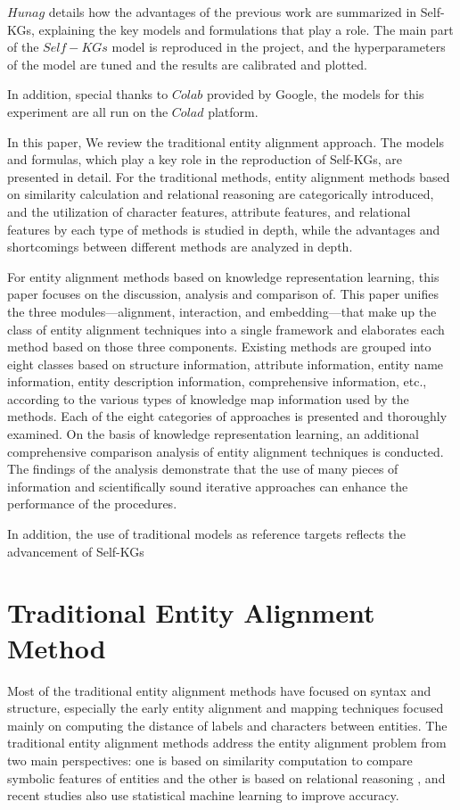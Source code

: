 \documentclass[sigconf]{acmart}
\begin{document}
$Hunag$ details how the advantages of the previous work are summarized in Self-KGs, explaining the key models and formulations that play a role. The main part of the $Self-KGs$ model is reproduced in the project, and the hyperparameters of the model are tuned and the results are calibrated and plotted.

In addition, special thanks to $Colab$ provided by Google, the models for this experiment are all run on the $Colad$ platform.

In this paper, We review the traditional entity alignment approach. The models and formulas, which play a key role in the reproduction of Self-KGs, are presented in detail. For the traditional methods, entity alignment methods based on similarity calculation and relational reasoning are categorically introduced, and the utilization of character features, attribute features, and relational features by each type of methods is studied in depth, while the advantages and shortcomings between different methods are analyzed in depth.

For entity alignment methods based on knowledge representation learning, this paper focuses on the discussion, analysis and comparison of. This paper unifies the three modules—alignment, interaction, and embedding—that make up the class of entity alignment techniques into a single framework and elaborates each method based on those three components. Existing methods are grouped into eight classes based on structure information, attribute information, entity name information, entity description information, comprehensive information, etc., according to the various types of knowledge map information used by the methods. Each of the eight categories of approaches is presented and thoroughly examined. On the basis of knowledge representation learning, an additional comprehensive comparison analysis of entity alignment techniques is conducted. The findings of the analysis demonstrate that the use of many pieces of information and scientifically sound iterative approaches can enhance the performance of the procedures.

In addition, the use of traditional models as reference targets reflects the advancement of Self-KGs

\section{Traditional Entity Alignment Method}

 Most of the traditional entity alignment methods have focused on syntax and structure, especially the early entity alignment and mapping techniques focused mainly on computing the distance of labels and characters between entities. The traditional entity alignment methods address the entity alignment problem from two main perspectives: one is based on similarity computation to compare symbolic features of entities \cite{cohen2002learning} and the other is based on relational reasoning \cite{halpin2010owl}, and recent studies also use statistical machine learning to improve accuracy.
\end{document}
